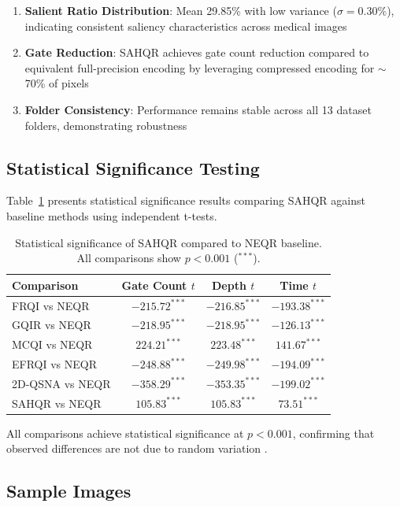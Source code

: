 \documentclass[pdflatex,sn-mathphys-num,Numbered]{sn-jnl}
\theoremstyle{thmstyleone}
\theoremstyle{thmstyletwo}
\theoremstyle{thmstylethree}
\begin{document}
\begin{enumerate}
\item \textbf{Salient Ratio Distribution}: Mean 29.85\% with low variance ($\sigma = 0.30\%$), indicating consistent saliency characteristics across medical images
\item \textbf{Gate Reduction}: SAHQR achieves gate count reduction compared to equivalent full-precision encoding by leveraging compressed encoding for $\sim$70\% of pixels
\item \textbf{Folder Consistency}: Performance remains stable across all 13 dataset folders, demonstrating robustness \cite{bib76,bib77}
\end{enumerate}

\subsection{Statistical Significance Testing}

Table~\ref{tab:significance} presents statistical significance results comparing SAHQR against baseline methods using independent t-tests.

\begin{table}[h!]
\caption{Statistical significance of SAHQR compared to NEQR baseline. All comparisons show $p < 0.001$ ($^{***}$).}
\label{tab:significance}
\centering
\begin{tabular}{@{}lccc@{}}
\toprule
Comparison & Gate Count $t$ & Depth $t$ & Time $t$ \\
\midrule
FRQI vs NEQR & $-215.72^{***}$ & $-216.85^{***}$ & $-193.38^{***}$ \\
GQIR vs NEQR & $-218.95^{***}$ & $-218.95^{***}$ & $-126.13^{***}$ \\
MCQI vs NEQR & $224.21^{***}$ & $223.48^{***}$ & $141.67^{***}$ \\
EFRQI vs NEQR & $-248.88^{***}$ & $-249.98^{***}$ & $-194.09^{***}$ \\
2D-QSNA vs NEQR & $-358.29^{***}$ & $-353.35^{***}$ & $-199.02^{***}$ \\
SAHQR vs NEQR & $105.83^{***}$ & $105.83^{***}$ & $73.51^{***}$ \\
\bottomrule
\end{tabular}
\end{table}
\FloatBarrier

All comparisons achieve statistical significance at $p < 0.001$, confirming that observed differences are not due to random variation \cite{bib78,bib79,bib80}.

\subsection{Sample Images}
\end{document}
